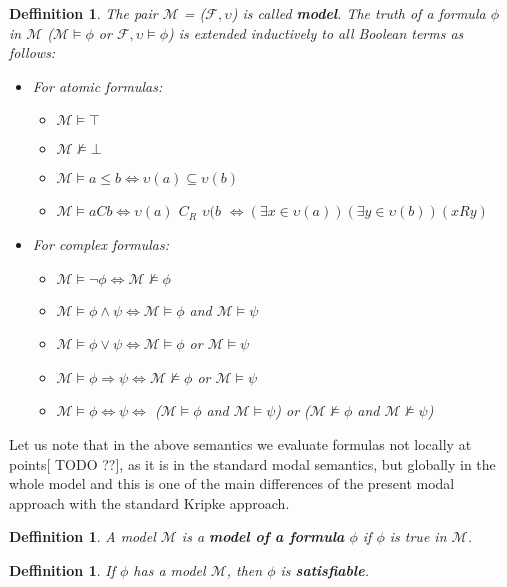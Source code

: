 \documentclass{article}
\newcommand\M{\mathcal{M}}
\newcommand\F{\mathcal{F}}
\newtheorem{defn}[theorem]{Deffinition}
\begin{document}
	\begin{defn}
		The pair $\M$ = ($\F, \upsilon$) is called \textbf{\textit{model}}. The truth of a formula $\phi$ in $\M$ ($\M \models \phi$ or $\F, \upsilon \models \phi$) is extended inductively to all Boolean terms as follows:
		\begin{itemize}
			\item For atomic formulas:
				\begin{itemize}
					\item $\M \models \top$
					\item $\M \not\models \bot$
					\item $\M \models a \leq b \iff \upsilon(a) \subseteq \upsilon(b)$
					\item $\M \models aCb \iff \upsilon(a)$ $C_R$ $\upsilon(b$ $\iff (\exists x \in \upsilon(a))(\exists y \in \upsilon(b))(xRy)$
				\end{itemize}
			\item For complex formulas:
				\begin{itemize}
					\item $\M \models \neg \phi \iff \M \not\models \phi$
					\item $\M \models \phi \land \psi \iff \M \models \phi$ and $\M \models \psi$
					\item $\M \models \phi \lor \psi \iff \M \models \phi$ or $\M \models \psi$
					\item $\M \models \phi \Rightarrow \psi \iff \M \not\models \phi$ or $\M \models \psi$
					\item $\M \models \phi \Leftrightarrow \psi \iff$ ($\M \models \phi$ and $\M \models \psi$) or ($\M \not\models \phi$ and $\M \not\models \psi$)
				\end{itemize}
		\end{itemize}
	\end{defn}
	\par
	Let us note that in the above semantics we evaluate formulas not locally at points[ TODO ??], as it is in the standard modal semantics, but globally in the whole model and this is one of the main differences of the present modal approach with the standard Kripke approach.

	\begin{defn}
		A model $\M$ is a \textit{\textbf{model of a formula}} $\phi$ if $\phi$ is \textit{true} in $\M$.
	\end{defn}

	\begin{defn}
		If $\phi$ has a model $\M$, then $\phi$ is \textbf{satisfiable}.
	\end{defn}
\end{document}
